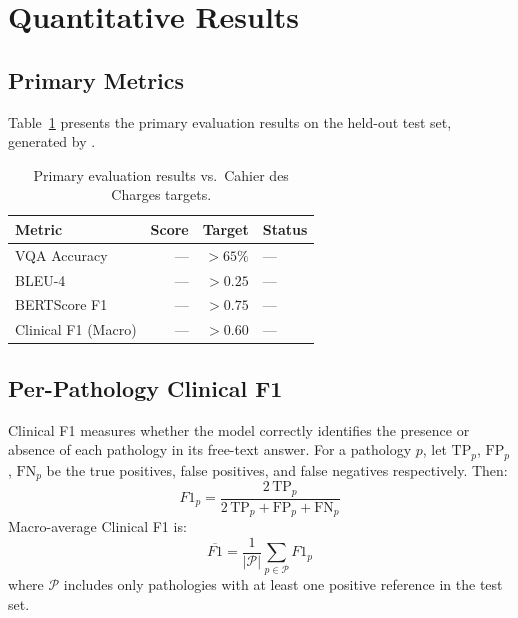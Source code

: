 \section{Quantitative Results}
\label{sec:quant}

\subsection{Primary Metrics}
\label{subsec:primary}

Table~\ref{tab:main_results} presents the primary evaluation results on
the held-out test set, generated by
.

\begin{table}[htbp]
\centering
\caption{Primary evaluation results vs.\ Cahier des Charges targets.}
\label{tab:main_results}
\begin{tabular}{@{}lrrl@{}}
\toprule
\textbf{Metric}     & \textbf{Score} & \textbf{Target} & \textbf{Status} \\
\midrule
VQA Accuracy        & ---   & $>65\%$  & --- \\
BLEU-4              & ---   & $>0.25$  & --- \\
BERTScore F1        & ---   & $>0.75$  & --- \\
Clinical F1 (Macro) & ---   & $>0.60$  & --- \\
\bottomrule
\end{tabular}
\end{table}

\subsection{Per-Pathology Clinical F1}
\label{subsec:clinical_f1}

Clinical F1 measures whether the model correctly identifies the
presence or absence of each pathology in its free-text answer.
For a pathology $p$, let $\mathrm{TP}_p$, $\mathrm{FP}_p$, $\mathrm{FN}_p$
be the true positives, false positives, and false negatives respectively.
Then:
\begin{equation}
  F1_p = \frac{2\,\mathrm{TP}_p}{2\,\mathrm{TP}_p + \mathrm{FP}_p + \mathrm{FN}_p}
  \label{eq:f1}
\end{equation}
Macro-average Clinical F1 is:
\begin{equation}
  \overline{F1} = \frac{1}{|\mathcal{P}|} \sum_{p \in \mathcal{P}} F1_p
  \label{eq:macro_f1}
\end{equation}
where $\mathcal{P}$ includes only pathologies with at least one positive
reference in the test set.

